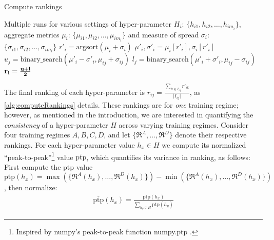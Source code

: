 \documentclass[10pt]{article} %
\begin{document}
\begin{algorithm}[!t]
\caption{Compute rankings}\label{alg:computeRankings}
\begin{algorithmic}[1]
\Require Multiple runs for various settings of hyper-parameter $H_i$: $\lbrace h_{i1},h_{i2},\ldots,h_{im_i}\rbrace$, aggregate metrics $\mu_i$: $\lbrace \mu_{i1},\mu_{i2},\ldots,\mu_{im_i}\rbrace$ and measure of spread $\sigma_i$: $\lbrace \sigma_{i1},\sigma_{i2},\ldots,\sigma_{im_i}\rbrace$
    \State $r'_{i} = \textrm{argsort}(\mu_i + \sigma_i)$ 
    \State $\mu'_i, \sigma'_i = \mu_i[r'_{i}], \sigma_i[r'_{i}]$ 
        \State $u_{j} = \textrm{binary\_search}(\mu'_i - \sigma'_i, \mu_{ij} + \sigma_{ij})$ 
        \State $l_{j} = \textrm{binary\_search}(\mu'_i + \sigma'_i, \mu_{ij} - \sigma_{ij})$ 
    \EndFor
    \State $\bf{r_{i}} = \frac{u + l}{2}$ 
\EndFor

\end{algorithmic}
\end{algorithm}

The final ranking of each hyper-parameter is $r_{ij} = \frac{\sum_{k \in I_{ij}} r
'_{ik}}{\vert I_{ij} \vert}$, 
as \autoref{alg:computeRankings} details. These rankings are for {\em one} training regime; however, as mentioned in the introduction, we are interested in quantifying the {\em consistency} of a hyper-parameter $H$ across varying training regimes. Consider four training regimes $A, B, C, D$, and let $\lbrace \mathfrak{R}^A,\ldots,\mathfrak{R}^D\rbrace$ denote their respective rankings. For each hyper-parameter value $h_x\in H$ we compute its normalized ``peak-to-peak''\footnote{Inspired by numpy's peak-to-peak function numpy.ptp \citep{harris2020array}.} value $\overline{\textrm{ptp}}$, which quantifies its variance in ranking, as follows: First compute the $\textrm{ptp}$ value $\textrm{ptp}(h_x) = \max\left(\lbrace \mathfrak{R}^A(h_x),\ldots,\mathfrak{R}^D(h_x)\rbrace\right) - \min\left(\lbrace \mathfrak{R}^A(h_x),\ldots,\mathfrak{R}^D(h_x)\rbrace\right)$, then normalize:
\begin{align}
    \overline{\textrm{ptp}}(h_x) = \frac{\textrm{ptp}(h_x)}{\sum_{h_y\in H}\textrm{ptp}(h_y)}
    \label{eqn:ptp}
\end{align}
\end{document}
